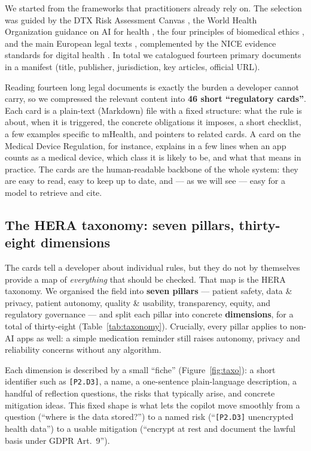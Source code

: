 \documentclass[11pt]{article}
\begin{document}
We started from the frameworks that practitioners already rely on. The selection was
guided by the DTX Risk Assessment Canvas \citep{denecke2023dtx}, the World Health
Organization guidance on AI for health \citep{who2024aihealth}, the four principles of
biomedical ethics \citep{beauchamp2019principles}, and the main European legal texts
\citep{euaiact2024,mdr2017,gdpr2016,iso82304}, complemented by the NICE evidence
standards for digital health \citep{nice2022esf}. In total we catalogued fourteen
primary documents in a manifest (title, publisher, jurisdiction, key articles, official
URL).

Reading fourteen long legal documents is exactly the burden a developer cannot carry, so
we compressed the relevant content into \textbf{46 short ``regulatory cards''}. Each card
is a plain-text (Markdown) file with a fixed structure: what the rule is about, when it
is triggered, the concrete obligations it imposes, a short checklist, a few examples
specific to mHealth, and pointers to related cards. A card on the Medical Device
Regulation, for instance, explains in a few lines when an app counts as a medical device,
which class it is likely to be, and what that means in practice. The cards are the
human-readable backbone of the whole system: they are easy to read, easy to keep up to
date, and --- as we will see --- easy for a model to retrieve and cite.

\subsection{The HERA taxonomy: seven pillars, thirty-eight dimensions}

The cards tell a developer about individual rules, but they do not by themselves provide
a map of \emph{everything} that should be checked. That map is the HERA taxonomy. We
organised the field into \textbf{seven pillars} --- patient safety, data \& privacy,
patient autonomy, quality \& usability, transparency, equity, and regulatory governance
--- and split each pillar into concrete \textbf{dimensions}, for a total of thirty-eight
(Table~\ref{tab:taxonomy}). Crucially, every pillar applies to non-AI apps as well: a
simple medication reminder still raises autonomy, privacy and reliability concerns
without any algorithm.

Each dimension is described by a small ``fiche'' (Figure~\ref{fig:taxo}): a short
identifier such as \texttt{[P2.D3]}, a name, a one-sentence plain-language description, a
handful of reflection questions, the risks that typically arise, and concrete mitigation
ideas. This fixed shape is what lets the copilot move smoothly from a question
(``where is the data stored?'') to a named risk (``\texttt{[P2.D3]} unencrypted health
data'') to a usable mitigation (``encrypt at rest and document the lawful basis under
GDPR Art.~9'').
\end{document}
